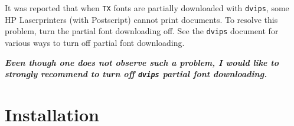 \documentclass[11pt]{article}
\begin{document}
It was reported that when \texttt{TX} fonts
are partially downloaded with \texttt{dvips},
some HP Laserprinters (with Postscript) cannot
print documents. To resolve this problem,
turn the partial font downloading off.
See the \texttt{dvips} document for various ways to
turn off partial font downloading.

\textbf{\itshape Even though one does not observe such a problem,
I would like to strongly recommend to turn off \texttt{dvips}
partial font downloading.}


\section{Installation}
\end{document}
